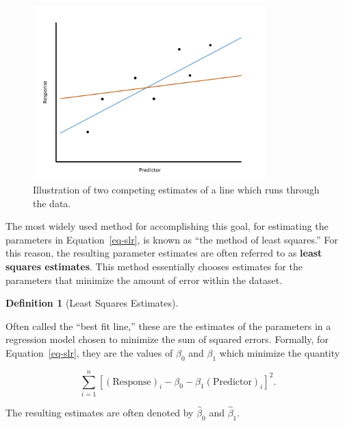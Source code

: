 \documentclass[
  letterpaper,
  DIV=11,
  numbers=noendperiod]{scrreprt}
\theoremstyle{plain}
\theoremstyle{definition}
\theoremstyle{definition}
\newtheorem{definition}{Definition}[chapter]
\theoremstyle{remark}
\begin{document}
\begin{figure}

{\centering \includegraphics[width=0.8\textwidth,height=\textheight]{./images/RegModel-LeastSquares.jpg}

}

\caption{\label{fig-regmodel-least-squares}Illustration of two competing
estimates of a line which runs through the data.}

\end{figure}

The most widely used method for accomplishing this goal, for estimating
the parameters in Equation~\ref{eq-slr}, is known as ``the method of
least squares.'' For this reason, the resulting parameter estimates are
often referred to as \textbf{least squares estimates}. This method
essentially chooses estimates for the parameters that minimize the
amount of error within the dataset.

\begin{definition}[Least Squares
Estimates]\protect\hypertarget{def-least-squares-estimates}{}\label{def-least-squares-estimates}

Often called the ``best fit line,'' these are the estimates of the
parameters in a regression model chosen to minimize the sum of squared
errors. Formally, for Equation~\ref{eq-slr}, they are the values of
\(\beta_0\) and \(\beta_1\) which minimize the quantity

\[\sum_{i=1}^n \left[(\text{Response})_i - \beta_0 - \beta_1(\text{Predictor})_{i}\right]^2.\]

The resulting estimates are often denoted by \(\widehat{\beta}_0\) and
\(\widehat{\beta}_1\).

\end{definition}
\end{document}

